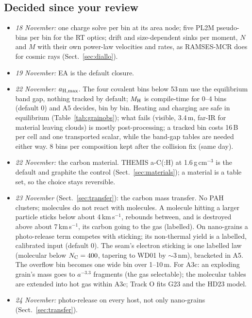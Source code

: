 \documentclass[11pt,a4paper]{article}
\newcommand{\NC}{N_{\rm C}}
\newcommand{\MH}{M_{\rm H}}
\begin{document}
\subsection{Decided since your review}
\begin{itemize}
\item \emph{18 November:} one charge solve per bin at its area node; five PL2M pseudo-bins per bin for the RT optics;
  drift and size-dependent sinks per moment, $N$ and $M$ with their own power-law velocities and rates, as RAMSES-MCR
  does for cosmic rays (Sect.~\ref{sec:diallo}).
\item \emph{19 November:} EA is the default closure.
\item \emph{22 November:} $a_{\rm H,max}$. The four covalent bins below 53\,nm use the equilibrium band gap, nothing
  tracked by default; $\MH$ is compile-time for 0--4 bins (default 0) and A5 decides, bin by bin. Heating and charging
  are safe in equilibrium (Table~\ref{tab:grainobs}); what fails (visible, 3.4\,\textmu m, far-IR for material leaving
  clouds) is mostly post-processing; a tracked bin costs 16\,B per cell and one transported scalar, while the band-gap
  tables are needed either way. 8 bins per composition kept after the collision fix (same day).
\item \emph{22 November:} the carbon material. THEMIS a-C(:H) at 1.6\,g\,cm$^{-3}$ is the default and graphite the
  control (Sect.~\ref{sec:materials}); a material is a table set, so the choice stays reversible.
\item \emph{23 November} (Sect.~\ref{sec:transfer}): the carbon mass transfer. No PAH clusters; molecules do not react
  with molecules. A molecule hitting a larger particle sticks below about 4\,km\,s$^{-1}$, rebounds between, and is
  destroyed above about 7\,km\,s$^{-1}$, its carbon going to the gas (labelled). On nano-grains a photo-release term
  competes with sticking; its non-thermal yield is a labelled, calibrated input (default 0). The seam's electron
  sticking is one labelled law (molecular below $\NC = 400$, tapering to WD01 by $\sim$3\,nm), bracketed in A5. The
  overflow bin becomes one wide bin over 1--10\,\textmu m. For A3c: an exploding grain's mass goes to $a^{-3.3}$
  fragments (the gas selectable); the molecular tables are extended into hot gas within A3c; Track O fits G23 and the
  HD23 model.
\item \emph{24 November:} photo-release on every host, not only nano-grains (Sect.~\ref{sec:transfer}).
\end{itemize}
\end{document}
